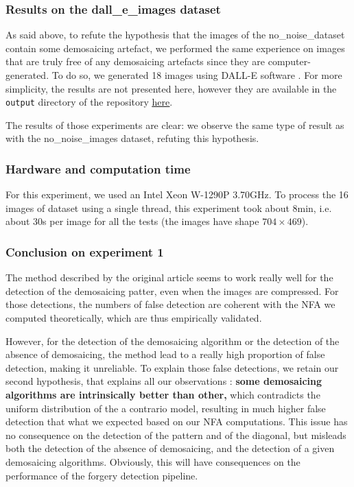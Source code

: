 \documentclass[sigconf, nonacm]{acmart}
\begin{document}
\subsubsection{Results on the dall\_e\_images dataset} \label{sec:exp_dall_e}

As said above, to refute the hypothesis that the images of the no\_noise\_dataset \cite{colom_noise_2023} contain some demosaicing artefact, we performed the same experience on images that are truly free of any demosaicing artefacts since they are computer-generated. To do so, we generated 18 images using DALL-E software \cite{ramesh_hierarchical_2022}. For more simplicity, the results are not presented here, however they are available in the \texttt{output} directory of the repository \href{https://github.com/DentanJeremie/demosaicing-detection}{\underline{here}}.

The results of those experiments are clear: we observe the same type of result as with the no\_noise\_images dataset, refuting this hypothesis.

\subsubsection{Hardware and computation time} For this experiment, we used an Intel Xeon W-1290P 3.70GHz. To process the 16 images of dataset \cite{colom_noise_2023} using a single thread, this experiment took about 8min, i.e. about 30s per image for all the tests (the images have shape $704\times469$).

\subsubsection{Conclusion on experiment 1} 

The method described by the original article seems to work really well for the detection of the demosaicing patter, even when the images are compressed. For those detections, the numbers of false detection are coherent with the NFA we computed theoretically, which are thus empirically validated.

However, for the detection of the demosaicing algorithm or the detection of the absence of demosaicing, the method lead to a really high proportion of false detection, making it unreliable. To explain those false detections, we retain our second hypothesis, that explains all our observations : \textbf{some demosaicing algorithms are intrinsically better than other,} which contradicts the uniform distribution of the a contrario model, resulting in much higher false detection that what we expected based on our NFA computations. This issue has no consequence on the detection of the pattern and of the diagonal, but misleads both the detection of the absence of demosaicing, and the detection of a given demosaicing algorithms. Obviously, this will have consequences on the performance of the forgery detection pipeline.
\end{document}
